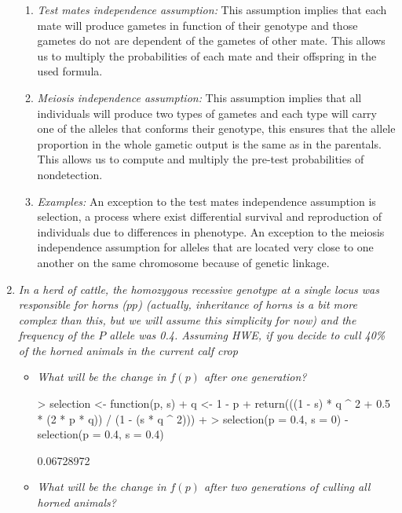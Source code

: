 \documentclass[12pt,a4paper]{paper}
\begin{document}
\begin{enumerate}
\begin{enumerate}
\item \emph{Test mates independence assumption:} This assumption implies that each mate will produce gametes in function of their genotype and those gametes do not are dependent of the gametes of other mate. This allows us to multiply the probabilities of each mate and their offspring in the used formula. 
\item \emph{Meiosis independence assumption:} This assumption implies that all individuals will produce two types of gametes and each type will carry one of the alleles that conforms their genotype, this ensures that the allele proportion in the whole gametic output is the same as in the parentals. This allows us to compute and multiply the pre-test probabilities of nondetection.
\item \emph{Examples:} An exception to the test mates independence assumption is selection, a process where exist differential survival and reproduction of individuals due to differences in phenotype. An exception to the meiosis independence assumption for alleles that are located very close to one another on the same chromosome because of genetic linkage.
\end{enumerate}
\item \emph{In a herd of cattle, the homozygous recessive genotype at a single locus was responsible for horns ($pp$) (actually, inheritance of horns is a bit more complex than this, but we will assume this simplicity for now) and the frequency of the $P$ allele was 0.4. Assuming HWE, if you decide to cull 40\% of the horned animals in the current calf crop}
\begin{itemize}
\item \emph{What will be the change in $f(p)$ after one generation?}
\begin{Schunk}
\begin{Sinput}
> selection <- function(p, s) {
+   q <- 1 - p
+   return(((1 - s) * q ^ 2 + 0.5 * (2 * p * q)) / (1 - (s * q ^ 2)))
+ }
> selection(p = 0.4, s = 0) - selection(p = 0.4, s = 0.4)
\end{Sinput}
\begin{Soutput}
[1] 0.06728972
\end{Soutput}
\end{Schunk}
\item \emph{What will be the change in $f(p)$ after two generations of culling all horned animals?}
\begin{Schunk}
\begin{Sinput}

\end{Sinput}
\end{Schunk}
\end{itemize}
\end{enumerate}
\end{document}
